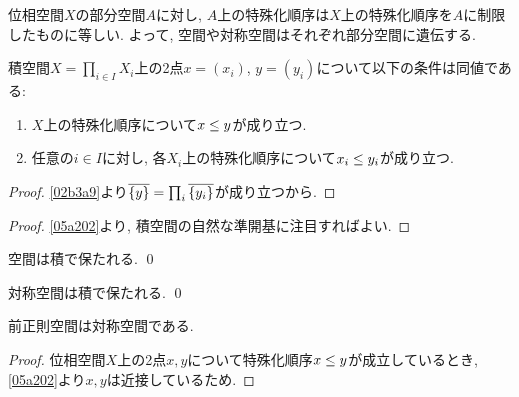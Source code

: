 \documentclass[uplatex, dvipdfmx, a4paper, 12pt, class=jsbook, crop=false]{standalone}
\begin{document}
位相空間$X$の部分空間$A$に対し, $A$上の特殊化順序は$X$上の特殊化順序を$A$に制限したものに等しい.
よって, 空間や対称空間はそれぞれ部分空間に遺伝する.

\begin{proposition}
	\label{a1a202}
	積空間$X = \prod_{i \in I} X_i$上の2点$x = (x_i)$, $y = (y_i)$について以下の条件は同値である:
	\begin{enumerate}
		\item $X$上の特殊化順序について$x \leq y$が成り立つ.
		\item 任意の$i \in I$に対し, 各$X_i$上の特殊化順序について$x_i \leq y_i$が成り立つ.
	\end{enumerate}
\end{proposition}

\begin{proof}
	\cref{02b3a9}より$\overline{\{y\}} = \prod_i \overline{\{y_i\}}$が成り立つから.
\end{proof}

\begin{proof}
	\cref{05a202}より, 積空間の自然な準開基に注目すればよい.
\end{proof}

\begin{corollary}
	空間は積で保たれる.
	\qed
\end{corollary}

\begin{corollary}
	対称空間は積で保たれる.
	\qed
\end{corollary}

\begin{proposition}
	前正則空間は対称空間である.
\end{proposition}

\begin{proof}
	位相空間\(X\)上の2点\(x ,y\)について特殊化順序\(x \leq y\)が成立しているとき,
	\cref{05a202}より\(x, y\)は近接しているため.
\end{proof}
\end{document}
